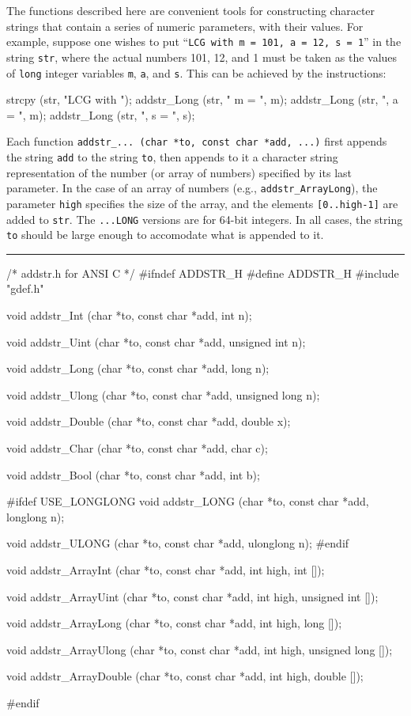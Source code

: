 
The functions described here are convenient tools for constructing
character strings that contain a series of numeric parameters, 
with their values.
For example, suppose one wishes to put 
``{\tt LCG with m = 101, a = 12, s = 1}'' in the string {\tt str}, 
where the actual 
numbers 101, 12, and 1 must be taken as the values of {\tt long}
integer variables {\tt m}, {\tt a}, and {\tt s}.  
This can be achieved by the instructions:
\vcode

   strcpy (str, "LCG with ");
   addstr\_Long (str, " m = ", m);
   addstr\_Long (str, ", a = ", m);
   addstr\_Long (str, ", s = ", s);
\endvcode

Each function {\tt addstr\_... (char *to, const char *add, ...)}
first appends the string {\tt add} to the string {\tt to}, then
appends to it a character string representation of the number 
(or array of numbers) specified by its last parameter.
In the case of an array of numbers (e.g., {\tt addstr\_ArrayLong}),
the parameter {\tt high} specifies the size of the array, and the
elements {\tt [0..high-1]} are added to {\tt str}.
The {\tt ...LONG} versions are for 64-bit integers.
In all cases, the string {\tt to} should be large enough to accomodate
what is appended to it.


\bigskip\hrule
\code\hide
/*  addstr.h  for ANSI C  */
#ifndef ADDSTR_H
#define ADDSTR_H
\endhide
#include "gdef.h"
\endcode

\code

void  addstr_Int (char *to, const char *add, int n);

void  addstr_Uint (char *to, const char *add, unsigned int n);

void  addstr_Long (char *to, const char *add, long n);

void  addstr_Ulong (char *to, const char *add, unsigned long n);

void  addstr_Double (char *to, const char *add, double x);

void  addstr_Char (char *to, const char *add, char c);

void  addstr_Bool (char *to, const char *add, int b);
\endcode
\code

#ifdef USE_LONGLONG
void  addstr_LONG (char *to, const char *add, longlong n);

void  addstr_ULONG (char *to, const char *add, ulonglong n);
#endif
\endcode
\code

void  addstr_ArrayInt (char *to, const char *add, int high, int []);

void  addstr_ArrayUint (char *to, const char *add, int high,
                        unsigned int []);

void  addstr_ArrayLong (char *to, const char *add, int high, long []);

void  addstr_ArrayUlong (char *to, const char *add, int high,
                         unsigned long []);

void  addstr_ArrayDouble (char *to, const char *add, int high, double []);

\hide
#endif
\endhide
\endcode

